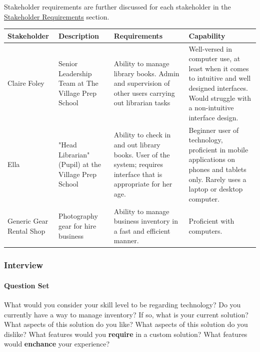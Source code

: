 \documentclass{article}
\begin{document}
Stakeholder requirements are further discussed for each stakeholder in the \underline{\hyperref[sec:stakeholderRequirements]{Stakeholder Requirements}} section.\\

\newcommand{\stakeholderEntry}[4]{{#1} & {#2} & {#3} & {#4}\\\hline}

\begin{tabular}{ |p{}|p{}|p{}|p{}| }
    \hline
    \textbf{Stakeholder} & \textbf{Description} & \textbf{Requirements} & \textbf{Capability}\\
    \hline

    \stakeholderEntry
        {Claire Foley}
        {Senior Leadership Team at The Village Prep School}
        {Ability to manage library books. Admin and supervision of other users carrying out librarian tasks}
        {Well-versed in computer use, at least when it comes to intuitive and well designed interfaces. Would struggle with a non-intuitive interface design.}
    
    \stakeholderEntry
        {Ella}
        {"Head Librarian" (Pupil) at the Village Prep School}
        {Ability to check in and out library books. User of the system; requires interface that is appropriate for her age.}
        {Beginner user of technology, proficient in mobile applications on phones and tablets only. Rarely uses a laptop or desktop computer.}
    
    \stakeholderEntry
        {Generic Gear \newline Rental Shop}
        {Photography gear for hire business}
        {Ability to manage business inventory in a fast and efficient manner.}
        {Proficient with computers.}
    \hline
\end{tabular}


\subsubsection{Interview}

\paragraph{Question Set}
\begin{outline}
    \1 What would you consider your skill level to be regarding technology?
    \1 Do you currently have a way to manage inventory?
    \2 If so, what is your current solution?
    \3 What aspects of this solution do you like?
    \3 What aspects of this solution do you dislike?
    \2 What features would you \textbf{require} in a custom solution?
    \2 What features would \textbf{enchance} your experience?
\end{outline}
\end{document}
